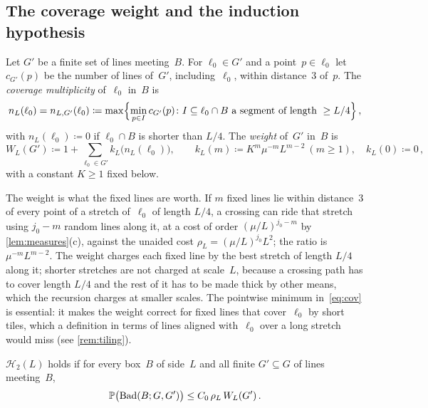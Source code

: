 \documentclass[11pt,letterpaper]{article}
\newcommand{\Bad}{\mathrm{Bad}}
\begin{document}
\subsection{The coverage weight and the induction hypothesis}

\begin{definition}
\label{def:multweight}
Let $G'$ be a finite set of lines meeting~$B$. For $\ell_0\in G'$ and a point~$p\in\ell_0$ let $c_{G'}(p)$ be the number of lines of~$G'$, including~$\ell_0$, within distance~$3$ of~$p$. The \emph{coverage multiplicity} of~$\ell_0$ in~$B$ is
\begin{equation}
\label{eq:cov}
  n_{L}(\ell_0)=n_{L,G'}(\ell_0)\coloneqq\max\Bigl\{\min_{p\in I}c_{G'}(p)\colon I\subseteq\ell_0\cap B\text{ a segment of length }\ge L/4\Bigr\}\,,
\end{equation}
with $n_L(\ell_0)\coloneqq0$ if $\ell_0\cap B$ is shorter than $L/4$. The \emph{weight} of~$G'$ in~$B$ is
\begin{equation}
\label{eq:weight}
  W_L(G')\coloneqq1+\sum_{\ell_0\in G'}k_L\bigl(n_L(\ell_0)\bigr),\qquad k_L(m)\coloneqq K^m\mu^{-m}L^{m-2}\ (m\ge1),\quad k_L(0)\coloneqq0\,,
\end{equation}
with a constant $K\ge1$ fixed below.
\end{definition}

The weight is what the fixed lines are worth. If $m$ fixed lines lie within distance~$3$ of every point of a stretch of~$\ell_0$ of length $L/4$, a crossing can ride that stretch using $j_0-m$ random lines along it, at a cost of order $(\mu/L)^{j_0-m}$ by \cref{lem:measures}(c), against the unaided cost $\rho_L=(\mu/L)^{j_0}L^2$; the ratio is $\mu^{-m}L^{m-2}$. The weight charges each fixed line by the best stretch of length $L/4$ along it; shorter stretches are not charged at scale~$L$, because a crossing path has to cover length $L/4$ and the rest of it has to be made thick by other means, which the recursion charges at smaller scales. The pointwise minimum in~\eqref{eq:cov} is essential: it makes the weight correct for fixed lines that cover~$\ell_0$ by short tiles, which a definition in terms of lines aligned with~$\ell_0$ over a long stretch would miss (see \cref{rem:tiling}).

\begin{definition}
\label{def:H2}
$\mathcal H_2(L)$ holds if for every box~$B$ of side~$L$ and all finite $G'\subseteq G$ of lines meeting~$B$,
\begin{equation}
\label{eq:H2}
  \P\bigl(\Bad(B;G,G')\bigr)\le C_0\,\rho_L\,W_L(G')\,.
\end{equation}
\end{definition}
\end{document}

